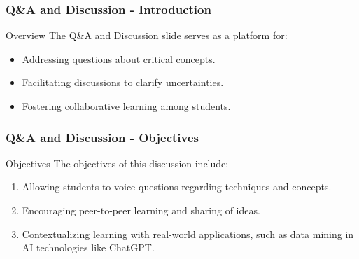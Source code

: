 \documentclass[aspectratio=169]{beamer}
\begin{document}
\begin{frame}[fragile]
    \frametitle{Q\&A and Discussion - Introduction}
    \begin{block}{Overview}
    The Q\&A and Discussion slide serves as a platform for:
    \begin{itemize}
        \item Addressing questions about critical concepts.
        \item Facilitating discussions to clarify uncertainties.
        \item Fostering collaborative learning among students.
    \end{itemize}
    \end{block}
\end{frame}

\begin{frame}[fragile]
    \frametitle{Q\&A and Discussion - Objectives}
    \begin{block}{Objectives}
    The objectives of this discussion include:
    \begin{enumerate}
        \item Allowing students to voice questions regarding techniques and concepts.
        \item Encouraging peer-to-peer learning and sharing of ideas.
        \item Contextualizing learning with real-world applications, such as data mining in AI technologies like ChatGPT.
    \end{enumerate}
    \end{block}
\end{frame}
\end{document}
